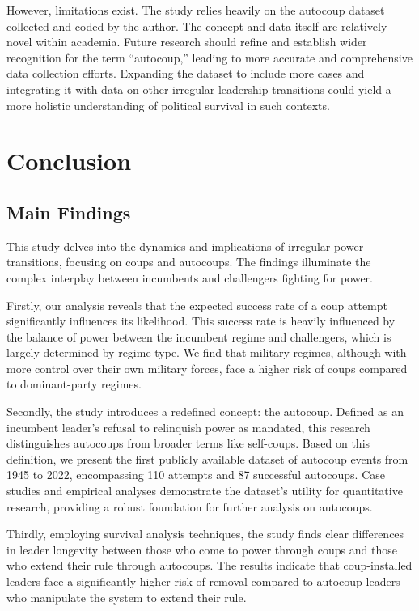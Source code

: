 \documentclass[
  12pt,
]{report}
\begin{document}
However, limitations exist. The study relies heavily on the autocoup
dataset collected and coded by the author. The concept and data itself
are relatively novel within academia. Future research should refine and
establish wider recognition for the term ``autocoup,'' leading to more
accurate and comprehensive data collection efforts. Expanding the
dataset to include more cases and integrating it with data on other
irregular leadership transitions could yield a more holistic
understanding of political survival in such contexts.

\chapter{Conclusion}\label{conclusion-3}

\section{Main Findings}\label{main-findings}

This study delves into the dynamics and implications of irregular power
transitions, focusing on coups and autocoups. The findings illuminate
the complex interplay between incumbents and challengers fighting for
power.

Firstly, our analysis reveals that the expected success rate of a coup
attempt significantly influences its likelihood. This success rate is
heavily influenced by the balance of power between the incumbent regime
and challengers, which is largely determined by regime type. We find
that military regimes, although with more control over their own
military forces, face a higher risk of coups compared to dominant-party
regimes.

Secondly, the study introduces a redefined concept: the autocoup.
Defined as an incumbent leader's refusal to relinquish power as
mandated, this research distinguishes autocoups from broader terms like
self-coups. Based on this definition, we present the first publicly
available dataset of autocoup events from 1945 to 2022, encompassing 110
attempts and 87 successful autocoups. Case studies and empirical
analyses demonstrate the dataset's utility for quantitative research,
providing a robust foundation for further analysis on autocoups.

Thirdly, employing survival analysis techniques, the study finds clear
differences in leader longevity between those who come to power through
coups and those who extend their rule through autocoups. The results
indicate that coup-installed leaders face a significantly higher risk of
removal compared to autocoup leaders who manipulate the system to extend
their rule.
\end{document}
